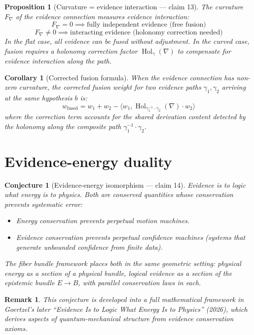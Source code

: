 \documentclass[11pt,a4paper]{article}
\newtheorem{proposition}[definition]{Proposition}
\newtheorem{corollary}[definition]{Corollary}
\newtheorem{remark}[definition]{Remark}
\newtheorem{conjecture}[definition]{Conjecture}
\begin{document}
\begin{proposition}[Curvature = evidence interaction --- claim 13]
\label{prop:curvature}
The curvature $F_\nabla$ of the evidence connection measures
evidence interaction:
\[
  F_\nabla = 0 \implies \text{fully independent evidence (free fusion)}
\]
\[
  F_\nabla \neq 0 \implies \text{interacting evidence (holonomy correction needed)}
\]
In the flat case, all evidence can be fused without adjustment.
In the curved case, fusion requires a holonomy correction factor
$\operatorname{Hol}_\gamma(\nabla)$ to compensate for evidence
interaction along the path.
\end{proposition}

\begin{corollary}[Corrected fusion formula]
When the evidence connection has non-zero curvature, the corrected
fusion weight for two evidence paths $\gamma_1, \gamma_2$ arriving
at the same hypothesis $b$ is:
\[
  w_{\text{fused}} = w_1 + w_2
    - \langle w_1, \operatorname{Hol}_{\gamma_1^{-1} \cdot \gamma_2}(\nabla) \cdot w_2 \rangle
\]
where the correction term accounts for the shared derivation content
detected by the holonomy along the composite path $\gamma_1^{-1} \cdot \gamma_2$.
\end{corollary}

\section{Evidence-energy duality}

\begin{conjecture}[Evidence-energy isomorphism --- claim 14]
Evidence is to logic what energy is to physics. Both are conserved
quantities whose conservation prevents systematic error:
\begin{itemize}
  \item Energy conservation prevents perpetual motion machines.
  \item Evidence conservation prevents perpetual confidence machines
    (systems that generate unbounded confidence from finite data).
\end{itemize}
The fiber bundle framework places both in the same geometric setting:
physical energy as a section of a physical bundle, logical evidence
as a section of the epistemic bundle $E \to B$, with parallel
conservation laws in each.
\end{conjecture}

\begin{remark}
This conjecture is developed into a full mathematical framework in
Goertzel's later ``Evidence Is to Logic What Energy Is to Physics''
(2026), which derives aspects of quantum-mechanical structure from
evidence conservation axioms.
\end{remark}
\end{document}
